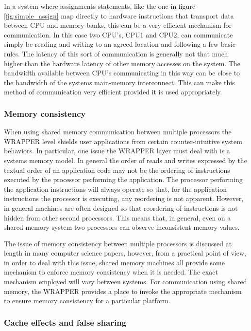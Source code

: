 In a system where assignments statements, like the one in figure 
\ref{fig:simple_assign} map directly to 
hardware instructions that transport data between CPU and memory banks, this 
can be a very efficient mechanism for communication. In this case two CPU's,
CPU1 and CPU2, can communicate simply be reading and writing to an 
agreed location and following a few basic rules. The latency of this sort
of communication is generally not that much higher than the hardware
latency of other memory accesses on the system. The bandwidth available
between CPU's communicating in this way can be close to the bandwidth of
the systems main-memory interconnect. This can make this method of 
communication very efficient provided it is used appropriately.

\subsubsection{Memory consistency}
\label{sect:memory_consistency}

When using shared memory communication between
multiple processors the WRAPPER level shields user applications from 
certain counter-intuitive system behaviors. In particular, one issue the 
WRAPPER layer must deal with is a systems memory model. In general the order 
of reads and writes expressed by the textual order of an application code may 
not be the ordering of instructions executed by the processor performing the 
application. The processor performing the application instructions will always
operate so that, for the application instructions the processor is executing, 
any reordering is not apparent. However, in general machines are often 
designed so that reordering of instructions is not hidden from other second 
processors.  This means that, in general, even on a shared memory system two 
processors can observe inconsistent memory values. 

The issue of memory consistency between multiple processors is discussed at 
length in many computer science papers, however, from a practical point of 
view, in order to deal with this issue, shared memory machines all provide 
some mechanism to enforce memory consistency when it is needed. The exact 
mechanism employed will vary between systems. For communication using shared 
memory, the WRAPPER provides a place to invoke the appropriate mechanism to 
ensure memory consistency for a particular platform.

\subsubsection{Cache effects and false sharing}
\label{sect:cache_effects_and_false_sharing}

